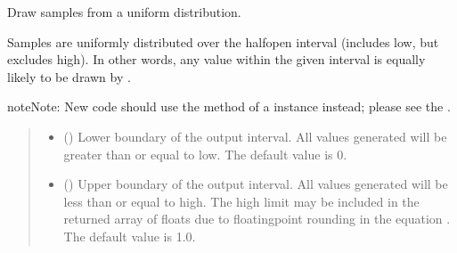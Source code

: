 \documentclass[letterpaper,10pt,english]{sphinxmanual}
\begin{document}
\begin{fulllineitems}
\label{\detokenize{metilda.controllers:metilda.controllers.pitch_art_wizard.uniform}}
\pysigstartsignatures
{}
\pysigstopsignatures
\sphinxAtStartPar
Draw samples from a uniform distribution.

\sphinxAtStartPar
Samples are uniformly distributed over the half\sphinxhyphen{}open interval
\sphinxcode{\sphinxupquote{{[}low, high)}} (includes low, but excludes high).  In other words,
any value within the given interval is equally likely to be drawn
by .

\begin{sphinxadmonition}{note}{Note:}
\sphinxAtStartPar
New code should use the 
method of a  instance instead;
please see the .
\end{sphinxadmonition}
\begin{quote}\begin{description}
\begin{itemize}
\item {} 
\sphinxAtStartPar
{} (\sphinxstyleliteralemphasis{\sphinxupquote{, }}) \textendash{} Lower boundary of the output interval.  All values generated will be
greater than or equal to low.  The default value is 0.

\item {} 
\sphinxAtStartPar
{} () \textendash{} Upper boundary of the output interval.  All values generated will be
less than or equal to high.  The high limit may be included in the
returned array of floats due to floating\sphinxhyphen{}point rounding in the
equation .  The default value
is 1.0.


\end{itemize}
\end{description}
\end{quote}
\end{fulllineitems}
\end{document}
